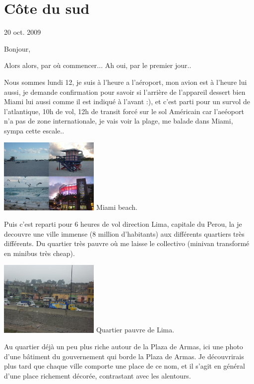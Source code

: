 \section{Côte du sud}

20 oct. 2009

\begin{multicols}{2}

Bonjour,

Alors alors, par où commencer... Ah oui, par le premier jour..

Nous sommes lundi 12, je suis à l'heure a l'aéroport, mon avion est à l'heure lui aussi, je demande confirmation pour savoir si l'arrière de l'appareil dessert bien Miami lui aussi comme il est indiqué à l'avant :), et c'est parti pour un survol de l'atlantique, 10h de vol, 12h de transit forcé sur le sol Américain car l'aeéoport n'a pas de zone internationale, je vais voir la plage, me balade dans Miami, sympa cette escale..

\hspace*{-0.65cm}
\includegraphics[width=4.8cm]{articles/Cote-du-sud/1255996649K0tQ.jpg}
Miami beach.

Puis c'est reparti pour 6 heures de vol direction Lima, capitale du Perou, la je decouvre une ville immense (8 million d'habitants) aux différents quartiers très différents. Du quartier très pauvre où me laisse le collectivo (minivan transformé en minibus très cheap).

\hspace*{-0.65cm}
\includegraphics[width=4.8cm]{articles/Cote-du-sud/1255996655Vfsf.jpg}
Quartier pauvre de Lima.

Au quartier déjà un peu plus riche autour de la Plaza de Armas, ici une photo d'une bâtiment du gouvernement qui borde la Plaza de Armas. Je découvrirais plus tard que chaque ville comporte une place de ce nom, et il s'agit en général d'une place richement décorée, contrastant avec les alentours.


\end{multicols}
